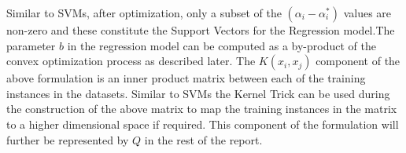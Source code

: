 \documentclass[12pt]{article}
\begin{document}
 Similar to SVMs, after optimization, only a subset of the $(\alpha_{i} - \alpha^*_{i})$ values are non-zero and these constitute the Support Vectors for the Regression model.The parameter $b$ in the regression model can be computed as a by-product of the convex optimization process as described later.
 \newline
 \newline
 The $K(x_{i}, x_{j})$ component of the above formulation is an inner product matrix between each of the training instances in the datasets\footnotemark. Similar to SVMs the Kernel Trick can be used during the construction of the above matrix to map the training instances in the matrix to a higher dimensional space if required. This component of the formulation will further be represented by $Q$ in the rest of the report.
\end{document}
